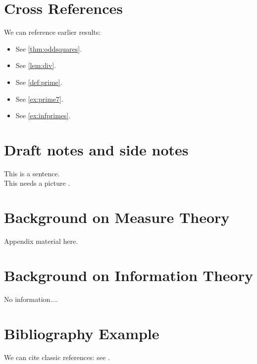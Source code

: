 \documentclass[11pt]{article}
\begin{document}
\section{Cross References}
We can reference earlier results:
\begin{itemize}[itemsep=2pt, topsep=2pt]
  \item See \autoref{thm:oddsquares}.
  \item See \autoref{lem:div}.
  \item See \autoref{def:prime}.
  \item See \autoref{ex:prime7}.
  \item See \autoref{ex:infprimes}.
\end{itemize}


\section{Draft notes and side notes}
This is a sentence.  \\
This needs a picture .

\newpage
\appendix
\section{Background on Measure Theory}
Appendix material here.

\section{Background on Information Theory}
No information....

\section{Bibliography Example}
We can cite classic references: see \cite{rudin1987real,cover2006elements}.

\newpage
\printbibliography
\end{document}
